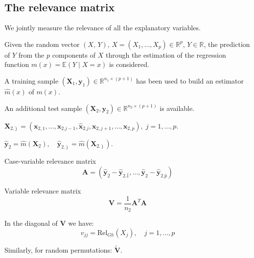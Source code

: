 \subsection{The relevance matrix}

We jointly measure the relevance of all the explanatory variables.

Given the random vector $(X,\,Y)$, $X = (X_1,\ldots,X_p) \in \mathds{R}^p$,
$Y \in \mathds{R}$, the prediction of $Y$ from the $p$ components of
$X$ through  the estimation of the regression function
$m(x) = \mathds{E}(Y \mid X = x)$ is considered.

A training sample $(\boldsymbol X_1, \boldsymbol y_1 ) \in \mathds R^{n_1 \times (p+1)}$
has been used to build an estimator $\widehat m(x)$ of $m(x)$.

An additional test sample $(\boldsymbol X_2, \boldsymbol y_2 ) \in \mathds R^{n_2 \times (p+1)}$
is available.

$\boldsymbol X_{2.\hat\jmath } = (\boldsymbol x_{2,1},\ldots,\boldsymbol x_{2.j-1}, \hat{\boldsymbol{x}}_{2.j}
	,\boldsymbol x_{2,j+1},\ldots,\boldsymbol x_{2,p}),\;j=1,\ldots,p$.

$\hat{\boldsymbol{y}}_2 = \widehat{m}(\boldsymbol X_{2}),\quad
	\hat{\boldsymbol{y}}_{2.\hat\jmath} = \widehat{m}(\boldsymbol X_{2.\hat\jmath})$.

\begin{definition}{Case-variable relevance matrix}{}
	\begin{equation*}
		\boldsymbol A = \left(
		\hat{\boldsymbol{y}}_{2} - \hat{\boldsymbol{y}}_{2.\hat 1},
		\ldots,
		\hat{\boldsymbol{y}}_{2} - \hat{\boldsymbol{y}}_{2.\hat p}
		\right)
	\end{equation*}
\end{definition}

\begin{definition}{Variable relevance matrix}{}
	\begin{equation*}
		\boldsymbol V = \frac{1}{n_2} \boldsymbol A^T \boldsymbol A
	\end{equation*}
	\tcblower

	In the diagonal of $\boldsymbol V$ we have:
	\begin{equation*}
		v_{jj} = \text{Rel}_{Gh}(X_j),\quad j=1,\ldots,p
	\end{equation*}

	Similarly, for random permutations: $\tilde{\boldsymbol{V}}$.
\end{definition}

